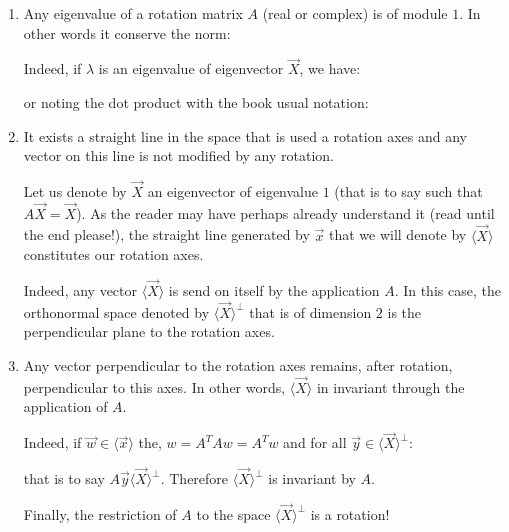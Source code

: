 	\begin{enumerate}
		\item Any eigenvalue of a rotation matrix $A$ (real or complex) is of module $1$. In other words it conserve the norm:

		Indeed, if $\lambda$ is an eigenvalue of eigenvector $\vec{X}$, we have:
		
		or noting the dot product with the book usual notation:
		
		
		\item  It exists a straight line in the space that is used a rotation axes and any vector on this line is not modified by any rotation.

		Let us denote by $\vec{X}$ an eigenvector  of eigenvalue $1$ (that is to say such that $A\vec{X}=\vec{X}$). As the reader may have perhaps already understand it (read until the end please!), the straight line generated by $\vec{x}$ that we will denote by $\langle \vec{X} \rangle$ constitutes our rotation axes.
	
		Indeed, any vector $\langle \vec{X} \rangle$ is send on itself by the application $A$. In this case, the orthonormal space denoted by $\langle \vec{X} \rangle^\perp$ that is of dimension $2$ is the perpendicular plane to the rotation axes.
	
		\item Any vector perpendicular to the rotation axes remains, after rotation, perpendicular to this axes. In other words,  $\langle \vec{X} \rangle$ in invariant through the application of $A$.
		
		Indeed, if $\vec{w}\in \langle \vec{x} \rangle$ the, $w=A^TA w=A^Tw$ and for all $\vec{y}\in \langle \vec{X} \rangle^\perp$:
		
		that is to say $A \vec{y} \langle \vec{X} \rangle^\perp$. Therefore $\langle \vec{X} \rangle^\perp$ is invariant by $A$.
		
		Finally, the restriction of $A$ to the space $\langle \vec{X} \rangle^\perp$ is a rotation!
	\end{enumerate}
